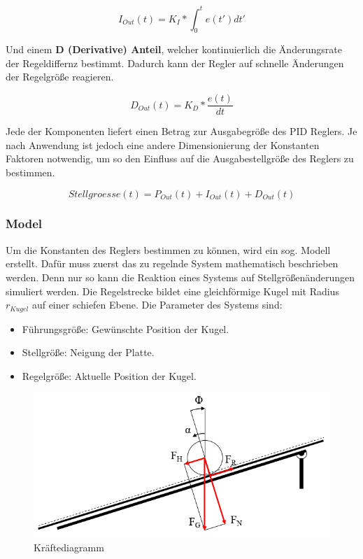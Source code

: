\documentclass[12pt,a4paper,bibliography=totoc,listof=totoc]{scrartcl}
\begin{document}
\begin{equation} 
I_{Out}(t) = K_I*\int_0^t e(t') dt'
\end{equation}

Und einem \textbf{D (Derivative) Anteil}, welcher kontinuierlich die Änderungsrate der Regeldiffernz bestimmt. Dadurch kann der Regler auf schnelle Änderungen der Regelgröße reagieren.

\begin{equation} 
D_{Out}(t) = K_D*\frac{e(t)}{dt}
\end{equation}

Jede der Komponenten liefert einen Betrag zur Ausgabegröße des PID Reglers. Je nach Anwendung ist jedoch eine andere Dimensionierung der Konstanten Faktoren notwendig, um so den Einfluss auf die Ausgabestellgröße des Reglers zu bestimmen.

\begin{equation} 
Stellgroesse(t) = P_{Out}(t) + I_{Out}(t) + D_{Out}(t)
\end{equation}

\subsubsection{Model}
Um die Konstanten des Reglers bestimmen zu können, wird ein sog. Modell erstellt. Dafür muss zuerst das zu regelnde System mathematisch beschrieben werden. Denn nur so kann die Reaktion eines Systems auf Stellgrößenänderungen simuliert werden. Die Regelstrecke bildet eine gleichförmige Kugel mit Radius \(r_{Kugel}\) auf einer schiefen Ebene.
Die Parameter des Systems sind:
\begin{itemize}
\item Führungsgröße: Gewünschte Position der Kugel.
\item Stellgröße: Neigung der Platte.
\item Regelgröße: Aktuelle Position der Kugel.
\end{itemize}

\begin{figure}[htb]
	\centering
	\includegraphics[scale = 0.8]{pics/RegelstreckeSkizze}
	\caption{Kräftediagramm}
	\label{RegelstreckeSkizze}
\end{figure}
\end{document}
